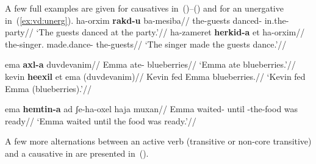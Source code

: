A few full examples are given for causatives in~(\nextx)--(\anextx) and for an unergative in~(\ref{ex:vd:unerg}).
\pex
	\a \begingl
		\gla ha-orxim \textbf{rakd-u} ba-mesiba//
		\glb the-guests danced- in.the-party//
		\glft `The guests danced at the party.'//
	\endgl
	\a \begingl
		\gla ha-zameret \textbf{herkid-a} et ha-orxim//
		\glb the-singer. made.dance-  the-guests//
		\glft `The singer made the guests dance.'//
	\endgl
\xe

\pex
	\a \begingl
		\gla ema \textbf{axl-a} duvdevanim//
		\glb Emma ate- blueberries//
		\glft `Emma ate blueberries.'//
	\endgl
	\a \begingl
		\gla kevin \textbf{heexil} et ema (duvdevanim)//
		\glb Kevin fed  Emma blueberries.//
		\glft `Kevin fed Emma (blueberries).'//
	\endgl %
\xe

\ex \label{ex:vd:unerg} \begingl
	\gla ema \textbf{hemtin-a} ad ʃe-ha-oxel haja muxan//
	\glb Emma waited- until -the-food was ready//
	\glft `Emma waited until the food was ready.'//
	\endgl
\xe

A few more alternations between an active verb {\tkal} (transitive or non-core transitive) and a causative in {\thif} are presented in~(\nextx).
\ex\label{ex:vd:kal-thif}
\xe

